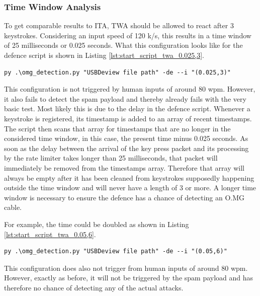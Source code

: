 \subsubsection{Time Window Analysis}


To get comparable results to ITA, TWA should be allowed to react after 3 keystrokes. Considering an input speed of 120 k/s, this results in a time window of 25 milliseconds or 0.025 seconds. What this configuration looks like for the defence script is shown in Listing \ref{lst:start_script_twa_0.025,3}.

\begin{lstlisting}[caption={start defence Script with TWA (0.025,3)},label={lst:start_script_twa_0.025,3}, captionpos=b]
 py .\omg_detection.py "USBDeview file path" -de --i "(0.025,3)"
\end{lstlisting}



This configuration is not triggered by human inputs of around 80 wpm. However, it also fails to detect the spam payload and thereby already fails with the very basic test. Most likely this is due to the delay in the defence script. Whenever a keystroke is registered, its timestamp is added to an array of recent timestamps. The script then scans that array for timestamps that are no longer in the considered time window, in this case, the present time minus 0.025 seconds. As soon as the delay between the arrival of the key press packet and its processing by the rate limiter takes longer than 25 milliseconds, that packet will immediately be removed from the timestamps array. Therefore that array will always be empty after it has been cleaned from keystrokes supposedly happening outside the time window and will never have a length of 3 or more. A longer time window is necessary to ensure the defence has a chance of detecting an O.MG cable.

For example, the time could be doubled as shown in Listing \ref{lst:start_script_twa_0.05,6}.

\begin{lstlisting}[caption={start defence Script with TWA (0.05,6)},label={lst:start_script_twa_0.05,6}, captionpos=b]
 py .\omg_detection.py "USBDeview file path" -de --i "(0.05,6)"
\end{lstlisting}

This configuration does also not trigger from human inputs of around 80 wpm. However, exactly as before, it will not be triggered by the spam payload and has therefore no chance of detecting any of the actual attacks.


